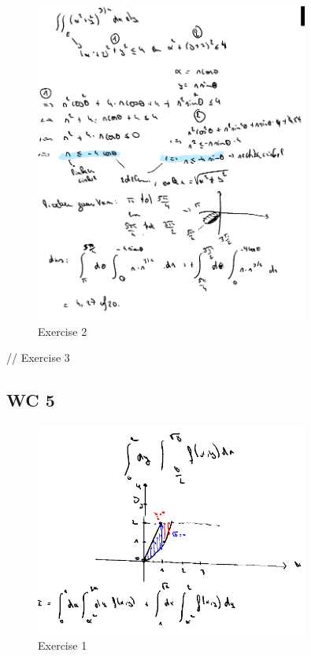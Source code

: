 \documentclass[a4paper]{report}
\begin{document}
\begin{figure}[H]
	\centering
	\includegraphics[width=0.8\textwidth]{assets/bord_5_ex_2.png}
	\caption{Exercise 2}
	\label{fig:bord_5_ex_2}
\end{figure}

// Exercise 3


\subsection*{WC 5}

\begin{figure}[H]
	\centering
	\includegraphics[width=0.8\textwidth]{assets/wc_5_ex_1.png}
	\caption{Exercise 1}
	\label{fig:wc_5_ex_1}
\end{figure}
\end{document}
